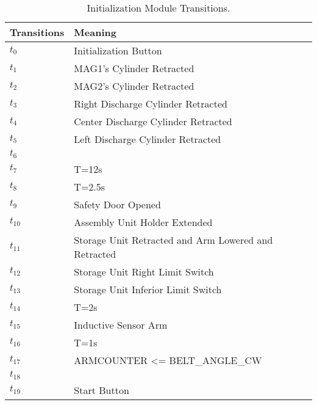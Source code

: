 \begin{table}[H]
\caption{Initialization Module Transitions.}
\centering
\begin{tabular}{M{5cm}M{10cm}}
Transitions & Meaning\\
\hline
\hyperlink{partialNet:t0}{\hypertarget{partialTable:t0}{$t_{0}$}} & Initialization Button\\
\hyperlink{partialNet:t1}{\hypertarget{partialTable:t1}{$t_{1}$}} & MAG1's Cylinder Retracted\\
\hyperlink{partialNet:t2}{\hypertarget{partialTable:t2}{$t_{2}$}} & MAG2's Cylinder Retracted\\
\hyperlink{partialNet:t3}{\hypertarget{partialTable:t3}{$t_{3}$}} & Right Discharge Cylinder Retracted\\
\hyperlink{partialNet:t4}{\hypertarget{partialTable:t4}{$t_{4}$}} & Center Discharge Cylinder Retracted\\
\hyperlink{partialNet:t5}{\hypertarget{partialTable:t5}{$t_{5}$}} & Left Discharge Cylinder Retracted\\
\hyperlink{partialNet:t6}{\hypertarget{partialTable:t6}{$t_{6}$}} & \\
\hyperlink{partialNet:tt7}{\hypertarget{partialTable:tt7}{$t_{7}$}} & T=12s\\
\hyperlink{partialNet:tt8}{\hypertarget{partialTable:tt8}{$t_{8}$}} & T=2.5s\\
\hyperlink{partialNet:t9}{\hypertarget{partialTable:t9}{$t_{9}$}} & Safety Door Opened\\
\hyperlink{partialNet:t10}{\hypertarget{partialTable:t10}{$t_{10}$}} & Assembly Unit Holder Extended\\
\hyperlink{partialNet:t11}{\hypertarget{partialTable:t11}{$t_{11}$}} & Storage Unit Retracted and Arm Lowered and Retracted\\
\hyperlink{partialNet:t12}{\hypertarget{partialTable:t12}{$t_{12}$}} & Storage Unit Right Limit Switch\\
\hyperlink{partialNet:t13}{\hypertarget{partialTable:t13}{$t_{13}$}} & Storage Unit Inferior Limit Switch\\
\hyperlink{partialNet:tt14}{\hypertarget{partialTable:tt14}{$t_{14}$}} & T=2s\\
\hyperlink{partialNet:t15}{\hypertarget{partialTable:t15}{$t_{15}$}} & Inductive Sensor Arm\\
\hyperlink{partialNet:tt16}{\hypertarget{partialTable:tt16}{$t_{16}$}} & T=1s\\
\hyperlink{partialNet:t17}{\hypertarget{partialTable:t17}{$t_{17}$}} & ARMCOUNTER <= BELT\_ANGLE\_CW\\
\hyperlink{partialNet:t18}{\hypertarget{partialTable:t18}{$t_{18}$}} & \\
\hyperlink{partialNet:t19}{\hypertarget{partialTable:t19}{$t_{19}$}} & Start Button\\
\end{tabular}
\end{table}
